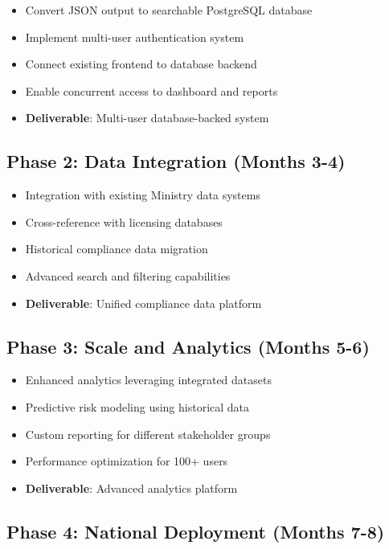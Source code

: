 \documentclass[11pt,a4paper]{article}
\begin{document}
\begin{itemize}
    \item Convert JSON output to searchable PostgreSQL database
    \item Implement multi-user authentication system
    \item Connect existing frontend to database backend
    \item Enable concurrent access to dashboard and reports
    \item \textbf{Deliverable}: Multi-user database-backed system
\end{itemize}

\subsection{Phase 2: Data Integration (Months 3-4)}

\begin{itemize}
    \item Integration with existing Ministry data systems
    \item Cross-reference with licensing databases
    \item Historical compliance data migration
    \item Advanced search and filtering capabilities
    \item \textbf{Deliverable}: Unified compliance data platform
\end{itemize}

\subsection{Phase 3: Scale and Analytics (Months 5-6)}

\begin{itemize}
    \item Enhanced analytics leveraging integrated datasets
    \item Predictive risk modeling using historical data
    \item Custom reporting for different stakeholder groups
    \item Performance optimization for 100+ users
    \item \textbf{Deliverable}: Advanced analytics platform
\end{itemize}

\subsection{Phase 4: National Deployment (Months 7-8)}
\end{document}
